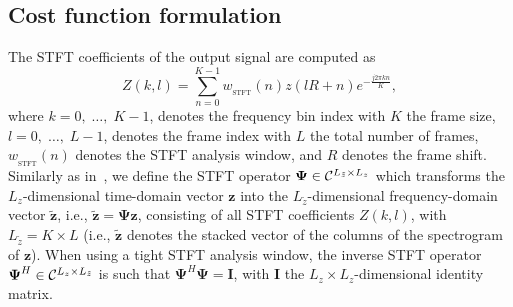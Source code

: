 \documentclass{article}
\begin{document}
\subsection{Cost function formulation}
The STFT coefficients of the output signal are computed as
\begin{equation}
Z(k,l) = \sum_{n=0}^{K-1}w_{_{\text{STFT}}}(n)z(lR+n)e^{-\frac{j 2 \pi k n}{K}},
\end{equation}
where $k = 0, \; \ldots, \; K\!-\!1$, denotes the frequency bin index with $K$ the frame size, $l = 0, \; \ldots, \; L-1$, denotes the frame index with $L$ the total number of frames, $w_{_{\text{STFT}}}(n)$ denotes the STFT analysis window, and $R$ denotes the frame shift. 
Similarly as in~\cite{Kowalski_ITASLP_2010}, we define the STFT operator $\boldsymbol{\Psi} \in {\cal{C}}^{L_{\tilde{z}}\times L_z}$ which transforms the $L_z$-dimensional time-domain vector $\mathbf{z}$ into the $L_{\tilde{z}}$-dimensional frequency-domain vector $\tilde{\mathbf{z}}$, i.e., $ \tilde{\mathbf{z}}= \boldsymbol{\Psi}\mathbf{z}$, consisting of all STFT coefficients $Z(k,l)$, with $L_{\tilde{z}} = K \times L$ (i.e., $\tilde{\mathbf{z}}$ denotes the stacked vector of the columns of the spectrogram of $\mathbf{z}$).
When using a tight STFT analysis window, the inverse STFT operator $\boldsymbol{\Psi}^H \in {\cal{C}}^{L_z \times L_{\tilde{z}}}$ is such that $\boldsymbol{\Psi}^H\boldsymbol{\Psi} = \mathbf{I}$, with $\mathbf{I}$ the $L_z \times L_z$-dimensional identity matrix.
\end{document}

